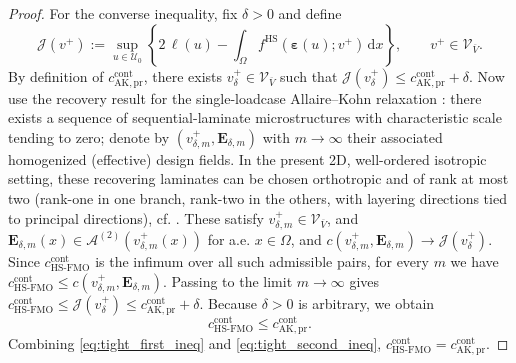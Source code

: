 \documentclass[preprint,3p]{elsarticle}
\newcommand{\tens}[1]{\bm{\mathit{#1}}}             %
\newcommand{\tenss}[1]{\bm{\mathbf{#1}}}            %
\newcommand{\tensf}[1]{\bm{\mathbf{#1}}}            %
\newcommand{\strain}{\tenss{\varepsilon}}           %
\begin{document}
\begin{proof}
For the converse inequality, fix $\delta>0$ and define
%
\begin{equation}
\mathcal J(v^+)
:=
\sup_{\tens{u}\in\mathcal U_0}
\left\{
2\,\ell(\tens{u})
-\int_\Omega f^{\mathrm{HS}}(\strain(\tens{u});v^+)\,\mathrm d\tens{x}
\right\},
\qquad v^+\in\mathcal V_{\overline{V}}.
\end{equation}
%
By definition of $c_{\mathrm{AK,pr}}^{\mathrm{cont}}$, there exists $v_\delta^+\in\mathcal V_{\overline{V}}$ such that $\mathcal J(v_\delta^+)\le c_{\mathrm{AK,pr}}^{\mathrm{cont}}+\delta$. Now use the recovery result for the single-loadcase Allaire--Kohn relaxation \citep{Allaire1993,Allaire1993od}: there exists a sequence of sequential-laminate microstructures with characteristic scale tending to zero; denote by $(v_{\delta,m}^+,\tensf E_{\delta,m})$ with $m\to\infty$ their associated homogenized (effective) design fields. In the present 2D, well-ordered isotropic setting, these recovering laminates can be chosen orthotropic and of rank at most two (rank-one in one branch, rank-two in the others, with layering directions tied to principal directions), cf. \citep{Allaire1993,Allaire2002}. These satisfy $v_{\delta,m}^+\in \mathcal V_{\overline{V}}$, and $\tensf E_{\delta,m}(\tens{x})\in\mathcal A^{(2)}(v_{\delta,m}^+(\tens{x}))$ for a.e. $\tens{x}\in\Omega$, and $c(v_{\delta,m}^+,\tensf E_{\delta,m})\longrightarrow \mathcal J(v_\delta^+)$. Since $c_{\mathrm{HS\text{-}FMO}}^{\mathrm{cont}}$ is the infimum over all such admissible pairs, for every $m$ we have $c_{\mathrm{HS\text{-}FMO}}^{\mathrm{cont}} \le c(v_{\delta,m}^+,\tensf E_{\delta,m})$. Passing to the limit $m\to\infty$ gives $c_{\mathrm{HS\text{-}FMO}}^{\mathrm{cont}} \le \mathcal J(v_\delta^+) \le c_{\mathrm{AK,pr}}^{\mathrm{cont}}+\delta$. Because $\delta>0$ is arbitrary, we obtain
%
\begin{equation}\label{eq:tight_second_ineq}
c_{\mathrm{HS\text{-}FMO}}^{\mathrm{cont}}
\le
c_{\mathrm{AK,pr}}^{\mathrm{cont}}.
\end{equation}
%
Combining \eqref{eq:tight_first_ineq} and \eqref{eq:tight_second_ineq}, $c_{\mathrm{HS\text{-}FMO}}^{\mathrm{cont}} = c_{\mathrm{AK,pr}}^{\mathrm{cont}}$.


\end{proof}
\end{document}
